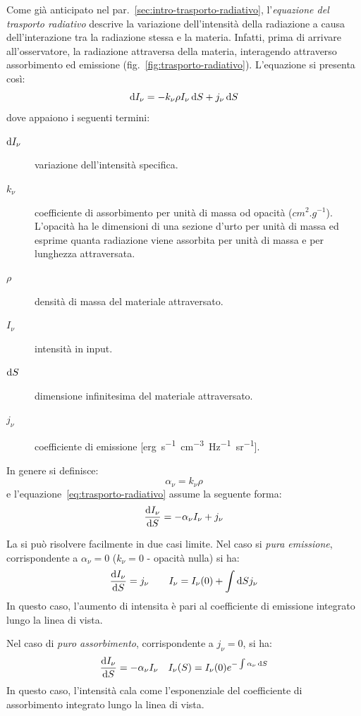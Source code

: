 Come già anticipato nel par.~\ref{sec:intro-trasporto-radiativo}, l'\emph{equazione del trasporto radiativo} descrive la variazione dell'intensità della radiazione a causa dell'interazione tra la radiazione stessa e la materia. Infatti, prima di arrivare all'osservatore, la radiazione attraversa della materia, interagendo attraverso assorbimento ed emissione (fig.~\ref{fig:trasporto-radiativo}). L'equazione si presenta così:
\begin{equation}\label{eq:trasporto-radiativo}
    \mathop{\mathrm{{}d}}\mathopen{} I_\nu = - k_\nu \rho I_\nu \mathop{\mathrm{{}d}}\mathopen{} S + j_\nu \mathop{\mathrm{{}d}}\mathopen{} S
\end{equation}
dove appaiono i seguenti termini:
\begin{description}
    \item[$\mathop{\mathrm{{}d}}\mathopen{} I_\nu$] variazione dell'intensità specifica.
    \item[$k_\nu$] coefficiente di assorbimento per unità di massa od opacità ($\si{cm^2.g^{-1}}$). L'opacità ha le dimensioni di una sezione d'urto per unità di massa ed esprime quanta radiazione viene assorbita per unità di massa e per lunghezza attraversata.
    \item[$\rho$] densità di massa del materiale attraversato.
    \item[$I_\nu$] intensità in input.
    \item[$\mathop{\mathrm{{}d}}\mathopen{} S$] dimensione infinitesima del materiale attraversato.
    \item[$j_\nu$] coefficiente di emissione [\si{erg.s^{-1}.cm^{-3}.Hz^{-1}.sr^{-1}}].
\end{description}

In genere si definisce:
\begin{equation}
\alpha_\nu = k_\nu \rho
\end{equation}
e l'equazione~\eqref{eq:trasporto-radiativo} assume la seguente forma:
\begin{equation}\label{eq:trasporto-radiativo2}
    \frac{\mathop{\mathrm{{}d}}\mathopen{} I_\nu}{\mathop{\mathrm{{}d}}\mathopen{} S} = -\alpha_\nu I_\nu + j_\nu
\end{equation}

La si può risolvere facilmente in due casi limite. Nel caso si \emph{pura emissione}, corrispondente a $\alpha_\nu = 0$ ($k_\nu = 0$ - opacità nulla) si ha:
\[
    \frac{\mathop{\mathrm{{}d}}\mathopen{} I_\nu}{\mathop{\mathrm{{}d}}\mathopen{} S} = j_\nu \qquad I_\nu = I_\nu (0) + \int \mathop{\mathrm{{}d}}\mathopen{} S j_\nu
\]
In questo caso, l'aumento di intensita è pari al coefficiente di emissione integrato lungo la linea di vista.

Nel caso di \emph{puro assorbimento}, corrispondente a $j_\nu = 0$, si ha:
\[
\frac{\mathop{\mathrm{{}d}}\mathopen{} I_\nu}{\mathop{\mathrm{{}d}}\mathopen{} S} = -\alpha_\nu I_\nu \quad 
I_\nu (S) = I_\nu (0) e^{-\int \alpha_\nu \mathop{\mathrm{{}d}}\mathopen{} S}
\]
In questo caso, l'intensità cala come l'esponenziale del coefficiente di assorbimento integrato lungo la linea di vista.

